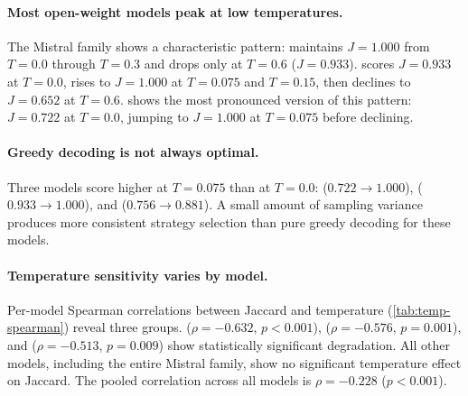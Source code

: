 \paragraph{Most open-weight models peak at low temperatures.}
The Mistral family shows a characteristic pattern:
 maintains $J = 1.000$ from $T = 0.0$
through $T = 0.3$ and drops only at $T = 0.6$ ($J = 0.933$).
 scores $J = 0.933$ at $T = 0.0$, rises to
$J = 1.000$ at $T = 0.075$ and $T = 0.15$, then declines to $J = 0.652$
at $T = 0.6$.  shows the most pronounced
version of this pattern: $J = 0.722$ at $T = 0.0$, jumping to $J = 1.000$
at $T = 0.075$ before declining.

\paragraph{Greedy decoding is not always optimal.}
Three models score higher at $T = 0.075$ than at $T = 0.0$:
 ($0.722 \to 1.000$),
 ($0.933 \to 1.000$), and
 ($0.756 \to 0.881$). A small amount of sampling
variance produces more consistent strategy selection than pure greedy
decoding for these models.

\paragraph{Temperature sensitivity varies by model.}
Per-model Spearman correlations between Jaccard and temperature
(\autoref{tab:temp-spearman}) reveal three groups.
 ($\rho = -0.632$, $p < 0.001$),
 ($\rho = -0.576$, $p = 0.001$), and
 ($\rho = -0.513$, $p = 0.009$) show
statistically significant degradation. All other models, including the
entire Mistral family, show no significant temperature effect on Jaccard.
The pooled correlation across all models is $\rho = -0.228$ ($p < 0.001$).

